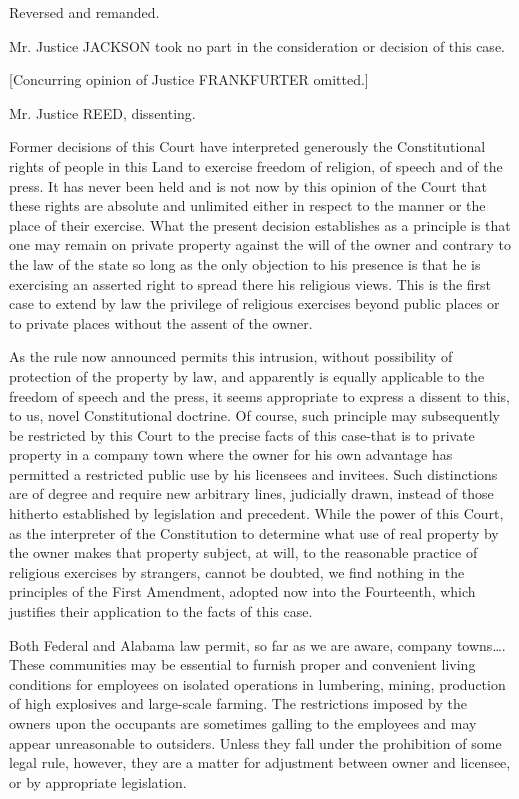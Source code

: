 Reversed and remanded.

Mr. Justice JACKSON took no part in the consideration or decision of this case. 

[Concurring opinion of Justice FRANKFURTER omitted.]

Mr. Justice REED, dissenting.

Former decisions of this Court have interpreted generously the Constitutional
rights of people in this Land to exercise freedom of religion, of speech and of
the press.  It has never been held and is not now by this opinion of the Court
that these rights are absolute and unlimited either in respect to the manner or
the place of their exercise.  What the present decision establishes as a
principle is that one may remain on private property against the will of the
owner and contrary to the law of the state so long as the only objection to his
presence is that he is exercising an asserted right to spread there his
religious views.  This is the first case to extend by law the privilege of
religious exercises beyond public places or to private places without the
assent of the owner.

As the rule now announced permits this intrusion, without possibility of
protection of the property by law, and apparently is equally applicable to the
freedom of speech and the press, it seems appropriate to express a dissent to
this, to us, novel Constitutional doctrine. Of course, such principle may
subsequently be restricted by this Court to the precise facts of this case-that
is to private property in a company town where the owner for his own advantage
has permitted a restricted public use by his licensees and invitees. Such
distinctions are of degree and require new arbitrary lines, judicially drawn,
instead of those hitherto established by legislation and precedent. While the
power of this Court, as the interpreter of the Constitution to determine what
use of real property by the owner makes that property subject, at will, to the
reasonable practice of religious exercises by strangers, cannot be doubted, we
find nothing in the principles of the First Amendment, adopted now into the
Fourteenth, which justifies their application to the facts of this case. 

Both Federal and Alabama law permit, so far as we are aware, company
towns\ldots. These communities may be essential to furnish proper and
convenient living conditions for employees on isolated operations in lumbering,
mining, production of high explosives and large-scale farming. The restrictions
imposed by the owners upon the occupants are sometimes galling to the employees
and may appear unreasonable to outsiders. Unless they fall under the
prohibition of some legal rule, however, they are a matter for adjustment
between owner and licensee, or by appropriate legislation.

